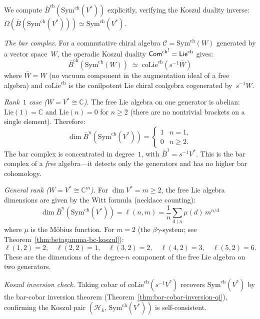 \begin{computation}
\label{comp:bar-sym-ch}
We compute $\bar{B}^{\mathrm{ch}}(\mathrm{Sym}^{\mathrm{ch}}(V^*))$
explicitly, verifying the Koszul duality inverse:
$\Omega(\bar{B}(\mathrm{Sym}^{\mathrm{ch}}(V^*)))
\simeq \mathrm{Sym}^{\mathrm{ch}}(V^*)$.

\emph{The bar complex.}
For a commutative chiral algebra $\mathcal{C} = \mathrm{Sym}^{\mathrm{ch}}(W)$
generated by a vector space~$W$, the operadic Koszul duality
${\mathsf{Com}^{\mathrm{ch}}}^! = \mathsf{Lie}^{\mathrm{ch}}$ gives:
\[
\bar{B}^{\mathrm{ch}}(\mathrm{Sym}^{\mathrm{ch}}(W))
\;\simeq\;
\mathrm{coLie}^{\mathrm{ch}}(s^{-1}\bar{W})
\]
where $\bar{W} = W$ (no vacuum component in the augmentation ideal
of a free algebra) and $\mathrm{coLie}^{\mathrm{ch}}$ is the
conilpotent Lie chiral coalgebra cogenerated by~$s^{-1}W$.

\emph{Rank~$1$ case ($W = V^* \cong \mathbb{C}$).}
The free Lie algebra on one generator is abelian: $\mathrm{Lie}(1) = \mathbb{C}$
and $\mathrm{Lie}(n) = 0$ for $n \geq 2$
(there are no nontrivial brackets on a single element).
Therefore:
\begin{equation}\label{eq:bar-sym-rank1}
\dim \bar{B}^n(\mathrm{Sym}^{\mathrm{ch}}(V^*)) =
\begin{cases}
1 & n = 1, \\
0 & n \geq 2.
\end{cases}
\end{equation}
The bar complex is concentrated in degree~$1$, with
$\bar{B}^1 = s^{-1}V^*$.  This is the bar complex of a
\emph{free} algebra---it detects only the generators and has
no higher bar cohomology.

\emph{General rank ($W = V^* \cong \mathbb{C}^m$).}
For $\dim V^* = m \geq 2$, the free Lie algebra dimensions
are given by the Witt formula (necklace counting):
\[
\dim \bar{B}^n(\mathrm{Sym}^{\mathrm{ch}}(V^*))
= \ell(n, m) = \frac{1}{n}\sum_{d \mid n} \mu(d)\, m^{n/d}
\]
where $\mu$ is the M\"obius function.  For $m = 2$
(the $\beta\gamma$-system; see Theorem~\ref{thm:betagamma-bc-koszul}):
\[
\ell(1,2) = 2,\quad
\ell(2,2) = 1,\quad
\ell(3,2) = 2,\quad
\ell(4,2) = 3,\quad
\ell(5,2) = 6.
\]
These are the dimensions of the degree-$n$ component of the
free Lie algebra on two generators.

\emph{Koszul inversion check.}
Taking cobar of $\mathrm{coLie}^{\mathrm{ch}}(s^{-1}V^*)$
recovers $\mathrm{Sym}^{\mathrm{ch}}(V^*)$ by the
bar-cobar inversion theorem
(Theorem~\ref{thm:bar-cobar-inversion-qi}), confirming the
Koszul pair $(\mathcal{H}_k,\,
\mathrm{Sym}^{\mathrm{ch}}(V^*))$ is self-consistent.
\end{computation}

